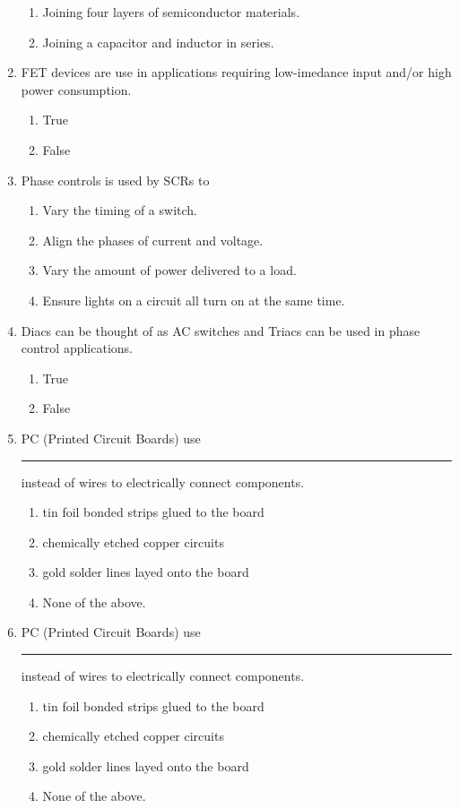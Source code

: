\documentclass[10pt]{article}
\begin{document}
\begin{multicols}{2}
\begin{enumerate}
\begin{enumerate}
	\item Joining four layers of semiconductor materials.
	\item Joining a capacitor and inductor in series.
	\end{enumerate}
\item FET devices are use in applications requiring low-imedance input and/or high power consumption.
	\begin{enumerate}
	\item True
	\item False
	\end{enumerate}
\item Phase controls is used by SCRs to
	\begin{enumerate}
	\item Vary the timing of a switch.
	\item Align the phases of current and voltage.
	\item Vary the amount of power delivered to a load.
	\item Ensure lights on a circuit all turn on at the same time.
	\end{enumerate}
\item Diacs can be thought of as AC switches and Triacs can be used in phase control applications.
	\begin{enumerate}
	\item True
	\item False
	\end{enumerate}
\item PC (Printed Circuit Boards) use \rule{1cm}{0.15mm} instead of wires to electrically connect components.
	\begin{enumerate}
	\item tin foil bonded strips glued to the board
	\item chemically etched copper circuits
	\item gold solder lines layed onto the board
	\item None of the above.
	\end{enumerate}
\item PC (Printed Circuit Boards) use \rule{1cm}{0.15mm} instead of wires to electrically connect components.
	\begin{enumerate}
	\item tin foil bonded strips glued to the board
	\item chemically etched copper circuits
	\item gold solder lines layed onto the board
	\item None of the above.

\end{enumerate}
\end{enumerate}
\end{multicols}
\end{document}
